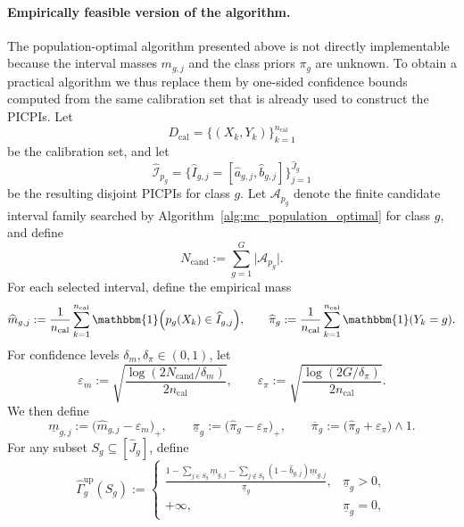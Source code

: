 \documentclass[11pt]{article}
\theoremstyle{statplain}
\theoremstyle{statdefinition}
\newcommand{\0}{\mathbf{0}}
\newcommand{\I}{\mathcal{I}}
\newcommand{\intervalset}{\I} %
\newcommand{\numClass}{G} %
\newcommand{\iteratorClass}{g}
\newcommand{\titleShorts}{PICPIs\xspace}
\begin{document}
\paragraph{Empirically feasible version of the algorithm.}
The population-optimal algorithm presented above is not directly implementable because the interval masses $m_{\iteratorClass,j}$ and the class priors $\pi_\iteratorClass$ are unknown.
To obtain a practical algorithm we thus replace them by one-sided confidence bounds computed from the same calibration set that is already used to construct the \titleShorts.
Let
\[
D_{\mathrm{cal}}=\bigl\{(X_k,Y_k)\bigr\}_{k=1}^{n_{\mathrm{cal}}}
\]
be the calibration set, and let
\[
\widehat{\intervalset}_{p_\iteratorClass}
=
\bigl\{
\widehat I_{\iteratorClass,j}
=
[\widehat a_{\iteratorClass,j},\widehat b_{\iteratorClass,j}]
\bigr\}_{j=1}^{\widehat J_\iteratorClass}
\]
be the resulting disjoint \titleShorts for class $\iteratorClass$.
Let $\mathcal{A}_{p_\iteratorClass}$ denote the finite candidate interval family searched by Algorithm~\ref{alg:mc_population_optimal} for class $\iteratorClass$, and define
\[
N_{\mathrm{cand}}
:=
\sum_{\iteratorClass=1}^{\numClass}
\bigl|\mathcal{A}_{p_\iteratorClass}\bigr|.
\]
For each selected interval, define the empirical mass
\[
\widehat m_{\iteratorClass,j}
:=
\frac{1}{n_{\mathrm{cal}}}
\sum_{k=1}^{n_{\mathrm{cal}}}
\mathbbm{1}\Bigl(
p_\iteratorClass(X_k)\in \widehat I_{\iteratorClass,j}
\Bigr),
\qquad
\widehat\pi_\iteratorClass
:=
\frac{1}{n_{\mathrm{cal}}}
\sum_{k=1}^{n_{\mathrm{cal}}}
\mathbbm{1}(Y_k=\iteratorClass).
\]
For confidence levels $\delta_m,\delta_\pi\in(0,1)$, let
\[
\varepsilon_m
:=
\sqrt{
\frac{\log(2N_{\mathrm{cand}}/\delta_m)}{2n_{\mathrm{cal}}}
},
\qquad
\varepsilon_\pi
:=
\sqrt{
\frac{\log(2\numClass/\delta_\pi)}{2n_{\mathrm{cal}}}
}.
\]
We then define
\[
\underline m_{\iteratorClass,j}
:=
\bigl(\widehat m_{\iteratorClass,j}-\varepsilon_m\bigr)_+,
\qquad
\underline\pi_\iteratorClass
:=
\bigl(\widehat\pi_\iteratorClass-\varepsilon_\pi\bigr)_+,
\qquad
\overline\pi_\iteratorClass
:=
\bigl(\widehat\pi_\iteratorClass+\varepsilon_\pi\bigr)\wedge 1.
\]
For any subset $S_\iteratorClass\subseteq [\widehat J_\iteratorClass]$, define
\[
\widehat\Gamma_{\iteratorClass}^{\mathrm{up}}(S_\iteratorClass)
:=
\begin{cases}
\displaystyle
\frac{
1-\sum_{j\in S_\iteratorClass}\underline m_{\iteratorClass,j}
-\sum_{j\notin S_\iteratorClass}(1-\widehat b_{\iteratorClass,j})\underline m_{\iteratorClass,j}
}{\underline\pi_\iteratorClass},
& \underline\pi_\iteratorClass>0,\\[3ex]
+\infty,
& \underline\pi_\iteratorClass=0,
\end{cases}
\]
\end{document}
